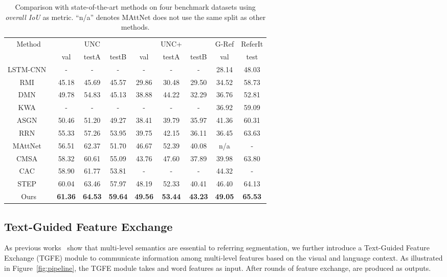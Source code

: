 \documentclass[10pt,twocolumn,letterpaper]{article}
\begin{document}
\begin{table*}[t]
   \centering
   \begin{tabular}{c|ccc|ccc|c|c}
       \hline
        Method & & UNC & & & UNC+ & & G-Ref & ReferIt \\
        & val & testA & testB & val & testA & testB & val & test \\
       \hline
       LSTM-CNN~\cite{hu2016segmentation} & - & - & - & - & - & - & 28.14 & 48.03 \\
       RMI~\cite{liu2017recurrent} & 45.18 & 45.69 & 45.57 & 29.86 & 30.48 & 29.50 & 34.52 & 58.73 \\
       DMN~\cite{margffoy2018dynamic} & 49.78 & 54.83 & 45.13 & 38.88 & 44.22 & 32.29 & 36.76 & 52.81 \\
       KWA~\cite{shi2018key} & - & - & - & - & - & - & 36.92 & 59.09 \\
       ASGN~\cite{qiu2019referring} & 50.46 & 51.20 & 49.27 & 38.41 & 39.79 & 35.97 & 41.36 & 60.31 \\
       RRN~\cite{li2018referring} & 55.33 & 57.26 & 53.95 & 39.75 & 42.15 & 36.11 & 36.45 & 63.63 \\
       MAttNet~\cite{yu2018mattnet} & 56.51 & 62.37 & 51.70 & 46.67 & 52.39 & 40.08 & n/a & - \\
       CMSA~\cite{ye2019cross} & 58.32 & 60.61 & 55.09 & 43.76 & 47.60 & 37.89 & 39.98 & 63.80 \\
       CAC~\cite{chen2019referring} & 58.90 & 61.77 & 53.81 & - & - & - & 44.32 & - \\
       STEP~\cite{chen2019see} & 60.04 & 63.46 & 57.97 & 48.19 & 52.33 & 40.41 & 46.40 & 64.13 \\
       \hline
       Ours & \textbf{61.36} & \textbf{64.53} & \textbf{59.64} & \textbf{49.56} & \textbf{53.44} & \textbf{43.23} & \textbf{49.05} & \textbf{65.53} \\
       \hline
   \end{tabular}
   \caption{Comparison with state-of-the-art methods on four benchmark datasets using \textit{overall IoU} as metric. ``n/a'' denotes MAttNet does not use the same split as other methods.}
   \label{tab:sota}
\end{table*}

\subsection{Text-Guided Feature Exchange}
As previous works~\cite{li2018referring}\cite{ye2019cross} show that multi-level 
semantics are essential to referring segmentation, we further introduce a Text-Guided 
Feature Exchange (TGFE) module to communicate information among multi-level features 
based on the visual and language context. 
As illustrated in Figure~\ref{fig:pipeline}, the TGFE module takes  and 
word features  as input. After  rounds of feature exchange, 
 are produced as outputs.
\end{document}
